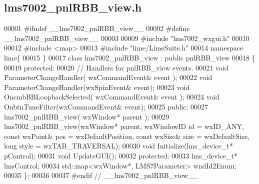\subsection{lms7002\+\_\+pnl\+R\+B\+B\+\_\+view.\+h}
\label{lms7002__pnlRBB__view_8h_source}

\begin{DoxyCode}
00001 \textcolor{preprocessor}{#ifndef \_\_lms7002\_pnlRBB\_view\_\_}
00002 \textcolor{preprocessor}{#define \_\_lms7002\_pnlRBB\_view\_\_}
00003 
00009 \textcolor{preprocessor}{#include "lms7002_wxgui.h"}
00010 
00012 \textcolor{preprocessor}{#include <map>}
00013 \textcolor{preprocessor}{#include "lime/LimeSuite.h"}
00014 \textcolor{keyword}{namespace }lime\{
00015 \}
00017 \textcolor{keyword}{class }lms7002_pnlRBB_view : \textcolor{keyword}{public} pnlRBB_view
00018 \{
00019     \textcolor{keyword}{protected}:
00020         \textcolor{comment}{// Handlers for pnlRBB\_view events.}
00021         \textcolor{keywordtype}{void} ParameterChangeHandler( wxCommandEvent& event );
00022         \textcolor{keywordtype}{void} ParameterChangeHandler(wxSpinEvent& event);
00023         \textcolor{keywordtype}{void} OncmbBBLoopbackSelected( wxCommandEvent& event );        
00024         \textcolor{keywordtype}{void} OnbtnTuneFilter(wxCommandEvent& event);
00025     \textcolor{keyword}{public}:
00027         lms7002_pnlRBB_view( wxWindow* parent );
00029     lms7002_pnlRBB_view(wxWindow* parent, wxWindowID \textcolor{keywordtype}{id} = wxID\_ANY, \textcolor{keyword}{const} wxPoint& pos = wxDefaultPosition,
       \textcolor{keyword}{const} wxSize& size = wxDefaultSize, \textcolor{keywordtype}{long} style = wxTAB\_TRAVERSAL);
00030     \textcolor{keywordtype}{void} Initialize(lms_device_t* pControl);
00031     \textcolor{keywordtype}{void} UpdateGUI();
00032 \textcolor{keyword}{protected}:
00033     lms_device_t* lmsControl;
00034     std::map<wxWindow*, LMS7Parameter> wndId2Enum;
00035 \};
00036 
00037 \textcolor{preprocessor}{#endif // \_\_lms7002\_pnlRBB\_view\_\_}
\end{DoxyCode}
